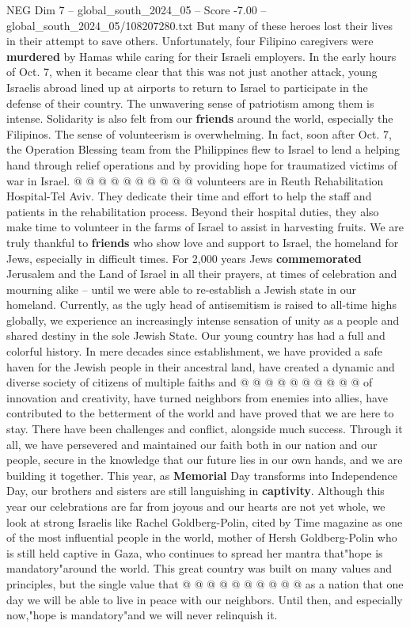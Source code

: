 \begin{textsample}{NEG Dim 7 – global\_south\_2024\_05 – Score -7.00 – global\_south\_2024\_05/108207280.txt}
But many of these heroes lost their lives in their attempt to save others.
Unfortunately, four Filipino caregivers were \textbf{murdered} by Hamas while caring for their Israeli employers.
In the early hours of Oct. 7, when it became clear that this was not just another attack, young Israelis abroad lined up at airports to return to Israel to participate in the defense of their country.
The unwavering sense of patriotism among them is intense.
Solidarity is also felt from our \textbf{friends} around the world, especially the Filipinos.
The sense of volunteerism is overwhelming.
In fact, soon after Oct. 7, the Operation Blessing team from the Philippines flew to Israel to lend a helping hand through relief operations and by providing hope for traumatized victims of war in Israel. @ @ @ @ @ @ @ @ @ @ volunteers are in Reuth Rehabilitation Hospital-Tel Aviv.
They dedicate their time and effort to help the staff and patients in the rehabilitation process.
Beyond their hospital duties, they also make time to volunteer in the farms of Israel to assist in harvesting fruits.
We are truly thankful to \textbf{friends} who show love and support to Israel, the homeland for Jews, especially in difficult times.
For 2,000 years Jews \textbf{commemorated} Jerusalem and the Land of Israel in all their prayers, at times of celebration and mourning alike -- until we were able to re-establish a Jewish state in our homeland.
Currently, as the ugly head of antisemitism is raised to all-time highs globally, we experience an increasingly intense sensation of unity as a people and shared destiny in the sole Jewish State.
Our young country has had a full and colorful history.
In mere decades since establishment, we have provided a safe haven for the Jewish people in their ancestral land, have created a dynamic and diverse society of citizens of multiple faiths and @ @ @ @ @ @ @ @ @ @ of innovation and creativity, have turned neighbors from enemies into allies, have contributed to the betterment of the world and have proved that we are here to stay.
There have been challenges and conflict, alongside much success.
Through it all, we have persevered and maintained our faith both in our nation and our people, secure in the knowledge that our future lies in our own hands, and we are building it together.
This year, as \textbf{Memorial} Day transforms into Independence Day, our brothers and sisters are still languishing in \textbf{captivity}.
Although this year our celebrations are far from joyous and our hearts are not yet whole, we look at strong Israelis like Rachel Goldberg-Polin, cited by Time magazine as one of the most influential people in the world, mother of Hersh Goldberg-Polin who is still held captive in Gaza, who continues to spread her mantra that"hope is mandatory"around the world.
This great country was built on many values and principles, but the single value that @ @ @ @ @ @ @ @ @ @ as a nation that one day we will be able to live in peace with our neighbors.
Until then, and especially now,"hope is mandatory"and we will never relinquish it.

\end{textsample}

